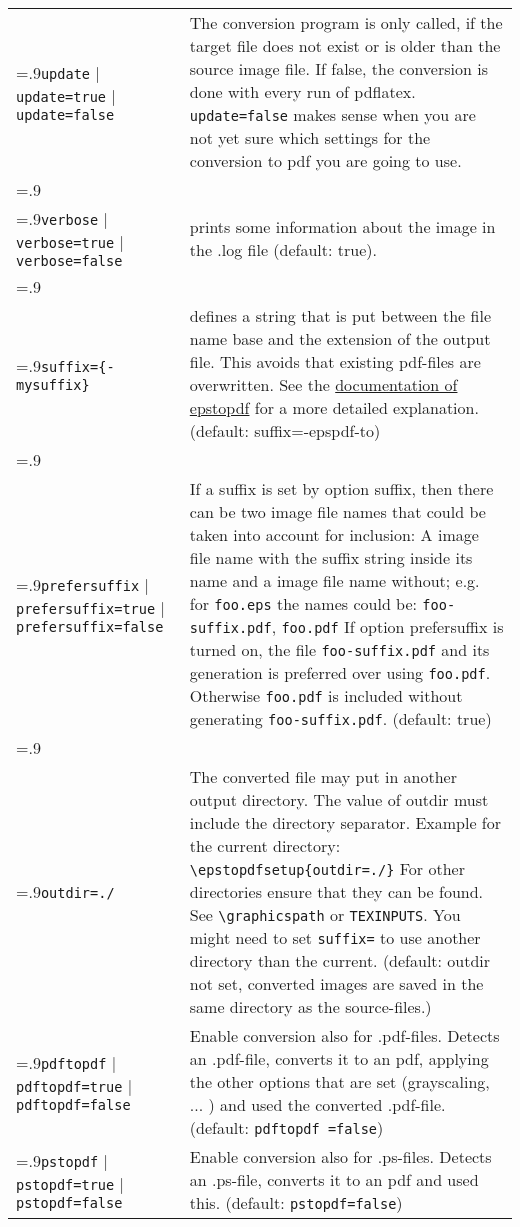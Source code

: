 \begin{longtable}{
>{\hsize=.9\hsize}X
>{\hsize=1.1\hsize}X  
}
%
\verb"update" | \verb"update=true" | \verb"update=false" & The conversion program is only called, if the target file does not exist or is older than the source image file. If false, the conversion is done with every run of pdflatex. \verb"update=false" makes sense when you are not yet sure which settings for the conversion to pdf you are going to use.\\  & \\
%
\verb"verbose" | \verb"verbose=true" | \verb"verbose=false" & prints some information about the image in the .log file (default: true). 
\\  & \\
%
\verb"suffix={-mysuffix}" & defines a string that is put between the file name base and the extension of the output file. This avoids that existing pdf-files are overwritten. See the  \href{http://www.ctan.org/tex-archive/macros/latex/contrib/oberdiek/epstopdf.pdf}{documentation of epstopdf} for a more detailed explanation. (default: suffix=-epspdf-to)\\  & \\
%
\verb"prefersuffix" | \verb"prefersuffix=true" | \verb"prefersuffix=false" & If a suffix is set by option suffix, then there can be two image file names that could be taken into account for inclusion: A image file name with the suffix string inside its name and a image file name without; e.g. for 
\verb"foo.eps" the names could be: 
\verb"foo-suffix.pdf", \verb"foo.pdf" 
If option prefersuffix is turned on, the file \verb"foo-suffix.pdf" and its generation 
is preferred over using \verb"foo.pdf". Otherwise \verb"foo.pdf" is included without generating \verb"foo-suffix.pdf". (default: true)\\  & \\
%
\verb"outdir=./" & The converted file may put in another output directory. The value of outdir must include the directory separator. Example for the current directory: \newline
\verb"\epstopdfsetup{outdir=./}"\newline
For other directories ensure that they can be found. See \verb"\graphicspath" or \verb"TEXINPUTS". You might need to set \verb"suffix=" to use another directory than the current. (default: outdir not set, converted images are saved in the same directory as the source-files.)  \\
%
\verb"pdftopdf" | \verb"pdftopdf=true" | \verb"pdftopdf=false" &  Enable conversion also for .pdf-files. Detects an .pdf-file, converts it to an pdf, applying the other options that are set (grayscaling, ... ) and used the converted .pdf-file. (default: \verb"pdftopdf =false")  \\
%
\verb"pstopdf" | \verb"pstopdf=true" | \verb"pstopdf=false" &  Enable conversion also for .ps-files. Detects an .ps-file, converts it to an pdf and used this. (default: \verb"pstopdf=false")  \\ \end{longtable}




